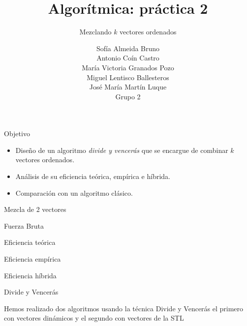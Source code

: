 \documentclass[spanish]{beamer}
\title{Algorítmica: práctica 2}
\subtitle{Mezclando $k$ vectores ordenados}
\author{Sofía Almeida Bruno\\ Antonio Coín Castro\\ María Victoria Granados Pozo\\ Miguel Lentisco Ballesteros\\ José María Martín Luque\\ \vspace{1em}Grupo 2}
\begin{document}
\maketitle

\begin{frame}{Objetivo}

	\begin{itemize}
		\item Diseño de un algoritmo \textit{divide y vencerás} que se encargue de combinar $k$ vectores ordenados. 
		\item Análisis de su eficiencia teórica, empírica e híbrida.
		\item Comparación con un algoritmo clásico.
	\end{itemize}

\end{frame}



\begin{frame}{Mezcla de 2 vectores}

	
\end{frame}


\begin{frame}{Fuerza Bruta}
	
\end{frame}



\begin{frame}{Eficiencia teórica}


\end{frame}

\begin{frame}{Eficiencia empírica}
	\begin{center}
		
	\end{center}

\end{frame}

\begin{frame}{Eficiencia híbrida}

\end{frame}


\begin{frame}{Divide y Vencerás}

	Hemos realizado dos algoritmos usando la técnica Divide y Vencerás el primero con vectores dinámicos y el segundo con vectores de la STL
\end{frame}
\end{document}
